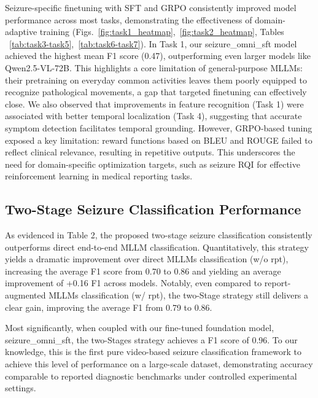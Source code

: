 \documentclass{article}
\theoremstyle{plain}
\theoremstyle{definition}
\theoremstyle{remark}
\begin{document}
Seizure-specific finetuning with SFT and GRPO consistently improved model performance across most tasks, demonstrating the effectiveness of domain-adaptive training (Figs.~\ref{fig:task1_heatmap},~\ref{fig:task2_heatmap}, Tables ~\ref{tab:task3-task5},~\ref{tab:task6-task7}). In Task 1, our seizure\_omni\_sft model achieved the highest mean F1 score (0.47), outperforming even larger models like Qwen2.5-VL-72B. This highlights a core limitation of general-purpose MLLMs: their pretraining on everyday common activities leaves them poorly equipped to recognize pathological movements, a gap that targeted finetuning can effectively close. We also observed that improvements in feature recognition (Task 1) were associated with better temporal localization (Task 4), suggesting that accurate symptom detection facilitates temporal grounding. However, GRPO-based tuning exposed a key limitation: reward functions based on BLEU and ROUGE failed to reflect clinical relevance, resulting in repetitive outputs. This underscores the need for domain-specific optimization targets, such as seizure RQI for effective reinforcement learning in medical reporting tasks. 

\subsection{Two-Stage Seizure Classification Performance}
As evidenced in Table 2, the proposed two-stage seizure classification consistently outperforms direct end-to-end MLLM classification. Quantitatively, this strategy yields a dramatic improvement over direct MLLMs classification (w/o rpt), increasing the average F1 score from 0.70 to 0.86 and yielding an average improvement of +0.16 F1 across models. Notably, even compared to report-augmented MLLMs classification (w/ rpt), the two-Stage strategy still delivers a clear gain, improving the average F1 from 0.79 to 0.86.

Most significantly, when coupled with our fine-tuned foundation model, seizure\_omni\_sft, the two-Stages strategy achieves a F1 score of 0.96. To our knowledge, this is the first pure video-based seizure classification framework to achieve this level of performance on a large-scale dataset, demonstrating accuracy comparable to reported diagnostic benchmarks under controlled experimental settings.
\end{document}

